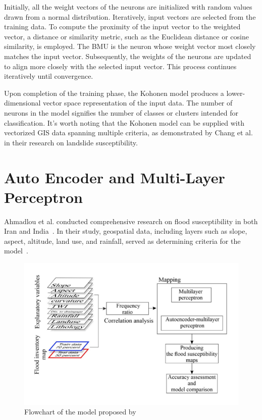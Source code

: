 \documentclass[a4paper,12pt]{Classes/RoboticsLaTeX}
\begin{document}
	Initially, all the weight vectors of the neurons are initialized with random values drawn from a normal distribution. Iteratively, input vectors are selected from the 
	training data. To compute the proximity of the input vector to the weighted vector, a distance or similarity metric, such as the Euclidean distance or cosine similarity, 
	is employed. The \ac{BMU} is the neuron whose weight vector most closely matches the input vector. Subsequently, the weights of the neurons are updated to 
	align more closely with the selected input vector. This process continues iteratively until convergence.

	Upon completion of the training phase, the Kohonen model produces a lower-dimensional vector space representation of the input data. The number of neurons in the model 
	signifies the number of classes or clusters intended for classification. It's worth noting that the Kohonen model can be supplied with vectorized GIS data spanning multiple 
	criteria, as demonstrated by Chang et al. in their research on landslide susceptibility\cite{chang2020}.

	\section{Auto Encoder and Multi-Layer Perceptron}

	Ahmadlou et al. conducted comprehensive research on flood susceptibility in both Iran and India~\cite{ahmadlou2020}. In their study, geospatial data, including layers such as 
	slope, aspect, altitude, land use, and rainfall, served as determining criteria for the model~\cite{ahmadlou2020}.

	\begin{figure}[H]
		\centering
		\includegraphics[width=1\textwidth]{Figures/AutoEncoder.png} %
		\caption{Flowchart of the model proposed by\cite{ahmadlou2020}}
		\label{fig:my_label8} %
	\end{figure}
\end{document}
